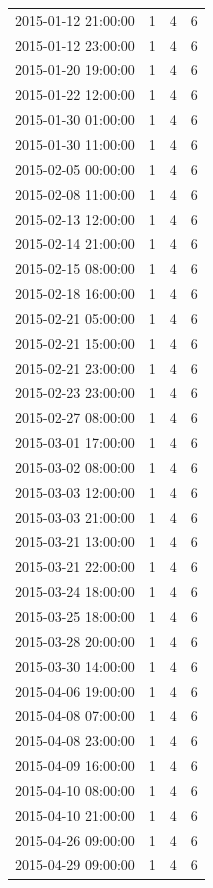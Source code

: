 \begin{tabular}{lrrr}
2015-01-12 21:00:00 & 1 & 4 & 6 \\
2015-01-12 23:00:00 & 1 & 4 & 6 \\
2015-01-20 19:00:00 & 1 & 4 & 6 \\
2015-01-22 12:00:00 & 1 & 4 & 6 \\
2015-01-30 01:00:00 & 1 & 4 & 6 \\
2015-01-30 11:00:00 & 1 & 4 & 6 \\
2015-02-05 00:00:00 & 1 & 4 & 6 \\
2015-02-08 11:00:00 & 1 & 4 & 6 \\
2015-02-13 12:00:00 & 1 & 4 & 6 \\
2015-02-14 21:00:00 & 1 & 4 & 6 \\
2015-02-15 08:00:00 & 1 & 4 & 6 \\
2015-02-18 16:00:00 & 1 & 4 & 6 \\
2015-02-21 05:00:00 & 1 & 4 & 6 \\
2015-02-21 15:00:00 & 1 & 4 & 6 \\
2015-02-21 23:00:00 & 1 & 4 & 6 \\
2015-02-23 23:00:00 & 1 & 4 & 6 \\
2015-02-27 08:00:00 & 1 & 4 & 6 \\
2015-03-01 17:00:00 & 1 & 4 & 6 \\
2015-03-02 08:00:00 & 1 & 4 & 6 \\
2015-03-03 12:00:00 & 1 & 4 & 6 \\
2015-03-03 21:00:00 & 1 & 4 & 6 \\
2015-03-21 13:00:00 & 1 & 4 & 6 \\
2015-03-21 22:00:00 & 1 & 4 & 6 \\
2015-03-24 18:00:00 & 1 & 4 & 6 \\
2015-03-25 18:00:00 & 1 & 4 & 6 \\
2015-03-28 20:00:00 & 1 & 4 & 6 \\
2015-03-30 14:00:00 & 1 & 4 & 6 \\
2015-04-06 19:00:00 & 1 & 4 & 6 \\
2015-04-08 07:00:00 & 1 & 4 & 6 \\
2015-04-08 23:00:00 & 1 & 4 & 6 \\
2015-04-09 16:00:00 & 1 & 4 & 6 \\
2015-04-10 08:00:00 & 1 & 4 & 6 \\
2015-04-10 21:00:00 & 1 & 4 & 6 \\
2015-04-26 09:00:00 & 1 & 4 & 6 \\
2015-04-29 09:00:00 & 1 & 4 & 6 \\

\end{tabular}
